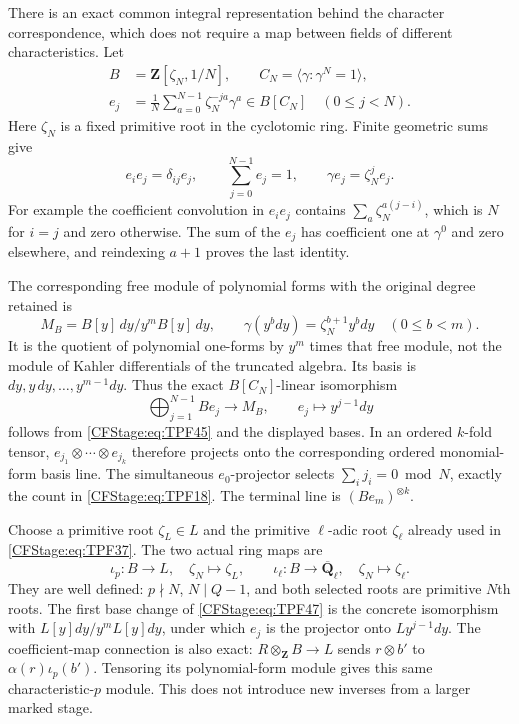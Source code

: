There is an exact common integral representation
behind the character correspondence, which
does not require a map between fields of
different characteristics. Let
\[
 \begin{split}
 B&=\mathbf Z[\zeta_N,1/N],\qquad
 C_N=\langle\gamma:\gamma^N=1\rangle,\\
 e_j&=\frac1N\sum_{a=0}^{N-1}
                   \zeta_N^{-ja}\gamma^a
             \in B[C_N]\quad(0\le j<N).
 \end{split}
 \tag{TPF.44}\label{CFStage:eq:TPF44}
\]
Here \(\zeta_N\) is a fixed primitive root in the
cyclotomic ring. Finite geometric sums give
\[
 e_ie_j=\delta_{ij}e_j,\qquad
 \sum_{j=0}^{N-1}e_j=1,\qquad
 \gamma e_j=\zeta_N^j e_j .
 \tag{TPF.45}\label{CFStage:eq:TPF45}
\]
For example the coefficient convolution in
\(e_ie_j\) contains
\(\sum_a\zeta_N^{a(j-i)}\), which is \(N\)
for \(i=j\) and zero otherwise. The sum of
the \(e_j\) has coefficient one at
\(\gamma^0\) and zero elsewhere, and
reindexing \(a+1\) proves the last identity.

The corresponding free module of polynomial
forms with the original degree retained is
\[
 M_B=B[y]\,dy/y^mB[y]\,dy,\qquad
 \gamma(y^bdy)=\zeta_N^{b+1}y^bdy
                      \quad(0\le b<m).
 \tag{TPF.46}\label{CFStage:eq:TPF46}
\]
It is the quotient of polynomial one-forms
by \(y^m\) times that free module, not the
module of Kahler differentials of the
truncated algebra. Its basis is
\(dy,y\,dy,\ldots,y^{m-1}dy\).
Thus the exact \(B[C_N]\)-linear isomorphism
\[
 \bigoplus_{j=1}^{N-1}B e_j
       \longrightarrow M_B,\qquad
 e_j\longmapsto y^{j-1}dy
 \tag{TPF.47}\label{CFStage:eq:TPF47}
\]
follows from \eqref{CFStage:eq:TPF45} and the displayed
bases. In an ordered \(k\)-fold tensor,
\(e_{j_1}\otimes\cdots\otimes e_{j_k}\)
therefore projects onto the corresponding
ordered monomial-form basis line. The
simultaneous \(e_0\)-projector selects
\(\sum_i j_i=0\bmod N\), exactly the count
in \eqref{CFStage:eq:TPF18}. The terminal line is
\((B e_m)^{\otimes k}\).

Choose a primitive root \(\zeta_L\in L\)
and the primitive \(\ell\)-adic root
\(\zeta_\ell\) already used in
\eqref{CFStage:eq:TPF37}. The two actual ring maps are
\[
 \iota_p:B\to L,\quad\zeta_N\mapsto\zeta_L,
 \qquad
 \iota_\ell:B\to\overline{\mathbf Q}_\ell,\quad
                  \zeta_N\mapsto\zeta_\ell .
 \tag{TPF.48}\label{CFStage:eq:TPF48}
\]
They are well defined: \(p\nmid N\),
\(N\mid Q-1\), and both selected roots are
primitive \(N\)th roots. The first base
change of \eqref{CFStage:eq:TPF47} is the concrete
isomorphism with
\(L[y]dy/y^mL[y]dy\), under which
\(e_j\) is the projector onto
\(L y^{j-1}dy\).
The coefficient-map connection is also exact:
\(R\otimes_{\mathbf Z}B\to L\) sends
\(r\otimes b'\) to \(\alpha(r)\iota_p(b')\).
Tensoring its polynomial-form module gives
this same characteristic-\(p\) module.
This does not introduce new inverses from
a larger marked stage.

